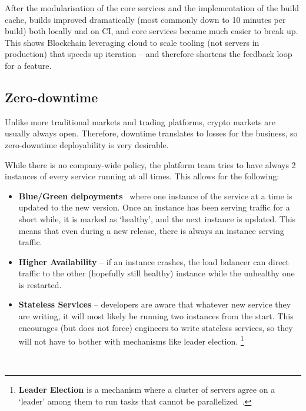 \documentclass[conference]{IEEEtran}
\begin{document}
    After the modularisation of the core services and the implementation of the build cache, builds
    improved dramatically (most commonly down to 10 minutes per build) both locally and on CI, and
    core services became much easier to break up.
    This shows Blockchain leveraging cloud to scale tooling (not servers in production) that speeds
    up iteration -- and therefore shortens the feedback loop for a feature.

    \subsection{Zero-downtime}

    Unlike more traditional markets and trading platforms, crypto markets are usually always open.
    Therefore, downtime translates to losses for the business, so zero-downtime deployability is
    very desirable.

    While there is no company-wide policy, the platform team tries to have always 2 instances
    of every service running at all times.
    This allows for the following:

    \begin{itemize}
        \newcommand{\entry}[1]{\item[] \hspace{-1em}\textbf{#1}}
        \entry{Blue/Green delpoyments}~\cite{nomadBlueGreen} where one instance of the
        service at a time is updated to the new version.
        Once an instance has been serving traffic for a short while, it is marked as `healthy', and
        the next instance is updated.
        This means that even during a new release, there is always an instance serving traffic.
        \entry{Higher Availability} -- if an instance crashes, the load balancer can direct traffic
        to the other (hopefully still healthy) instance while the unhealthy one is restarted.
        \entry{Stateless Services} -- developers are aware that whatever new service they are
        writing, it will most likely be running two instances from the start.
        This encourages (but does not force) engineers to write stateless services, so they will not
        have to bother with mechanisms like leader election.
        \footnote{\textbf{Leader Election} is a mechanism where a cluster of servers agree on a
        `leader' among them to run tasks that cannot be parallelized~\cite{attiya2004distributed}.}
    \end{itemize}\\
\end{document}
